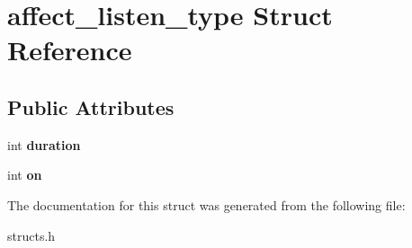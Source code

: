\hypertarget{structaffect__listen__type}{\section{affect\-\_\-listen\-\_\-type Struct Reference}
\label{structaffect__listen__type}
}
\subsection*{Public Attributes}
\begin{DoxyCompactItemize}
\item 
\hypertarget{structaffect__listen__type_a3e2a072afdf608dadf85d0268c3bbedc}{int {\bfseries duration}}\label{structaffect__listen__type_a3e2a072afdf608dadf85d0268c3bbedc}

\item 
\hypertarget{structaffect__listen__type_a2702c90f48713420f36448b9df5581d9}{int {\bfseries on}}\label{structaffect__listen__type_a2702c90f48713420f36448b9df5581d9}

\end{DoxyCompactItemize}


The documentation for this struct was generated from the following file\-:\begin{DoxyCompactItemize}
\item 
structs.\-h\end{DoxyCompactItemize}

